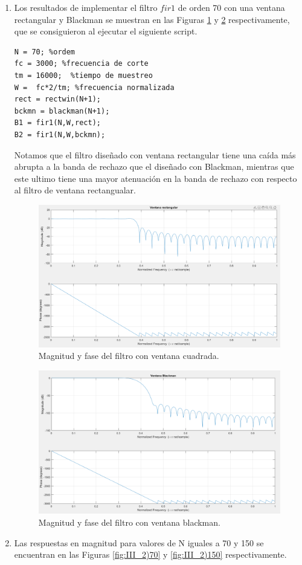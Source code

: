 \documentclass[letterpaper,onecolumn,10pt,journal,final]{IEEEtran}
\begin{document}
\begin{enumerate}[1)]
    \item %
    Los resultados de implementar el filtro $fir1$ de orden 70 con una ventana rectangular y Blackman se muestran en las Figuras \ref{fig:III_1)cuadrada} y \ref{fig:III_1)blackman} respectivamente, que se consiguieron al ejecutar el siguiente script.
    
    \begin{lstlisting}
N = 70; %ordem
fc = 3000; %frecuencia de corte
tm = 16000;  %tiempo de muestreo
W =  fc*2/tm; %frecuencia normalizada
rect = rectwin(N+1);
bckmn = blackman(N+1);
B1 = fir1(N,W,rect);
B2 = fir1(N,W,bckmn);
    \end{lstlisting}

Notamos que el filtro diseñado con ventana rectangular tiene una caída más abrupta a la banda de rechazo que el diseñado con Blackman, mientras que este ultimo tiene una mayor atenuación en la banda de rechazo con respecto al filtro de ventana rectangualar. 

    \begin{figure}[H]
        \centering
        \includegraphics[width=0.75 \linewidth]{Figuras/III_1)rect2.png}
        \caption{Magnitud y fase del filtro con ventana cuadrada.}
        \label{fig:III_1)cuadrada}
    \end{figure}
    \begin{figure}[H]
        \centering
        \includegraphics[width=0.75 \linewidth]{Figuras/III_1)blackman2.png}
        \caption{Magnitud y fase del filtro con ventana blackman.}
        \label{fig:III_1)blackman}
    \end{figure}
    \item%
    Las respuestas en magnitud para valores de N iguales a 70 y 150 se encuentran en las Figuras \ref{fig:III_2)70} y \ref{fig:III_2)150} respectivamente.
    

\end{enumerate}
\end{document}
